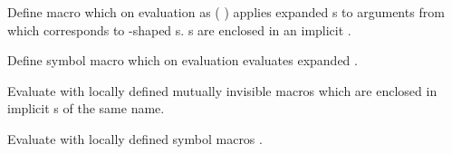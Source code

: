 \begin{LIST}{1cm}

  {
  Define macro  which on evaluation as (
  ) applies expanded s to arguments from
   which corresponds to -shaped
  s. s are enclosed in an implicit
   .
  }

  {
  Define symbol macro  which on evaluation evaluates
  expanded . 
  }

  {
  Evaluate  with locally defined mutually
  invisible macros  which are enclosed in implicit s
  of the same name.
  }

  {
  Evaluate  with locally defined symbol macros
  . 
  }


\end{LIST}
